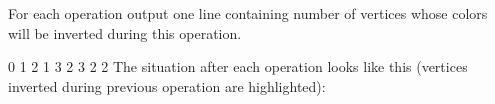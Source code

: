 
For each operation output one line containing number of vertices whose colors will be inverted
during this operation.



0
1
2
1
3
2
3
2
2
\sampleCOMMENT
The situation after each operation looks like this (vertices inverted during previous operation are highlighted):
\sampleEND
{}

